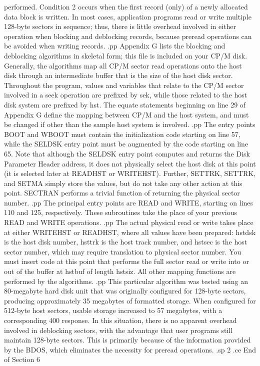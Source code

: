 performed.  Condition 2 occurs when the first record (only) of a 
newly allocated data block is written.  In most cases, 
application programs read or write multiple 128-byte sectors in 
sequence; thus, there is little overhead involved in either 
operation when blocking and deblocking records, because preread 
operations can be avoided when writing records.
.pp
Appendix G lists the blocking and deblocking algorithms in 
skeletal form; this file is included on your CP/M disk.  
Generally, the algorithms map all CP/M sector read operations 
onto the host disk through an intermediate buffer that is the 
size of the host disk sector.  Throughout the program, values and 
variables that relate to the CP/M sector involved in a seek 
operation are prefixed by sek, while those related to the host 
disk system are prefixed by hst.  The equate statements beginning 
on line 29 of Appendix G define the mapping between CP/M and the 
host system, and must be changed if other than the sample host 
system is involved.
.pp
The entry points BOOT and WBOOT must contain the initialization 
code starting on line 57, while the SELDSK entry point must be 
augmented by the code starting on line 65.  Note that although 
the SELDSK entry point computes and returns the Disk Parameter 
Header address, it does not physically select the host disk at 
this point (it is selected later at READHST or WRITEHST).  
Further, SETTRK, SETTRK, and SETMA simply store the values, but 
do not take any other action at this point.  SECTRAN performs a 
trivial function of returning the physical sector number.
.pp
The principal entry points are READ and WRITE, starting on lines 
110 and 125, respectively.  These subroutines take the place of 
your previous READ and WRITE operations.
.pp
The actual physical read or write takes place at either WRITEHST 
or READHST, where all values have been prepared:  hstdsk is the 
host disk number, hsttrk is the host track number, and 
hstsec is the host sector number, which 
may require translation to physical sector number.  You must 
insert code at this point that performs the full sector read or write 
into or out of the buffer at hstbuf of length hstsiz.  All other mapping 
functions are performed by the algorithms.
.pp
This particular algorithm was tested using an 80-megabyte hard 
disk unit that was originally configured for 128-byte sectors, 
producing approximately 35 megabytes of formatted storage.  When 
configured for 512-byte host sectors, usable storage increased to 
57 megabytes, with a corresponding 400%
response.  In this situation, there is no apparent overhead 
involved in deblocking sectors, with the advantage that user 
programs still maintain 128-byte sectors.  This is primarily 
because of the information provided by the BDOS, which eliminates 
the necessity for preread operations.
.sp 2
.ce
End of Section 6














